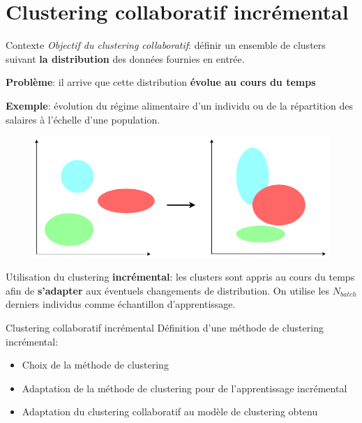 \documentclass[hyperref={pdfpagelabels=false}]{beamer}
\begin{document}
    \section{Clustering collaboratif incrémental}
        \begin{frame}{Contexte}
            \textit{Objectif du clustering collaboratif}: définir un ensemble de 
            clusters suivant \textbf{la distribution} des données fournies en 
            entrée.

            \textbf{Problème}: il arrive que cette distribution \textbf{évolue 
            au cours du temps}

            \textbf{Exemple}: évolution du régime alimentaire d'un individu ou 
            de la répartition des salaires à l'échelle d'une population.

            \begin{figure}[b]
                \centering
                \includegraphics[scale=.2]{changedistrib}
            \end{figure}

            Utilisation du clustering \textbf{incrémental}: les clusters sont 
            appris au cours du temps afin de \textbf{s'adapter} aux éventuels 
            changements de distribution. On utilise les $N_{batch}$ derniers 
            individus comme échantillon d'apprentissage.

        \end{frame}

        \begin{frame}{Clustering collaboratif incrémental}
            Définition d'une méthode de clustering incrémental:
            \begin{itemize}
                \item<2-> Choix de la méthode de clustering
                \item<3-> Adaptation de la méthode de clustering pour de 
                    l'apprentissage incrémental
                \item<4-> Adaptation du clustering collaboratif au modèle de 
                    clustering obtenu
            \end{itemize}
        \end{frame}
\end{document}

